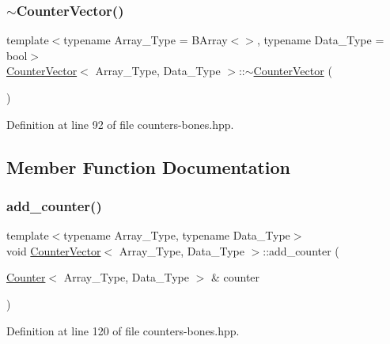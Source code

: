 \subsubsection{\texorpdfstring{$\sim$\+Counter\+Vector()}{~CounterVector()}}
{\footnotesize\ttfamily template$<$typename Array\+\_\+\+Type = B\+Array$<$$>$, typename Data\+\_\+\+Type = bool$>$ \\
\hyperlink{class_counter_vector}{Counter\+Vector}$<$ Array\+\_\+\+Type, Data\+\_\+\+Type $>$\+::$\sim$\hyperlink{class_counter_vector}{Counter\+Vector} (\begin{DoxyParamCaption}{ }\end{DoxyParamCaption})\hspace{0.3cm}{\ttfamily [inline]}}



Definition at line 92 of file counters-\/bones.\+hpp.



\subsection{Member Function Documentation}
\mbox{\label{class_counter_vector_a34fda06ff678691daf3b0455c1a2af48}} 
\subsubsection{\texorpdfstring{add\+\_\+counter()}{add\_counter()}\hspace{0.1cm}{\footnotesize\ttfamily [1/3]}}
{\footnotesize\ttfamily template$<$typename Array\+\_\+\+Type, typename Data\+\_\+\+Type$>$ \\
void \hyperlink{class_counter_vector}{Counter\+Vector}$<$ Array\+\_\+\+Type, Data\+\_\+\+Type $>$\+::add\+\_\+counter (\begin{DoxyParamCaption}\item[{\hyperlink{class_counter}{Counter}$<$ Array\+\_\+\+Type, Data\+\_\+\+Type $>$ \&}]{counter }\end{DoxyParamCaption})\hspace{0.3cm}{\ttfamily [inline]}}



Definition at line 120 of file counters-\/bones.\+hpp.

\mbox{\label{class_counter_vector_a062d52e18f1d3ba4c00cbf4c2d89f1e7}} 

